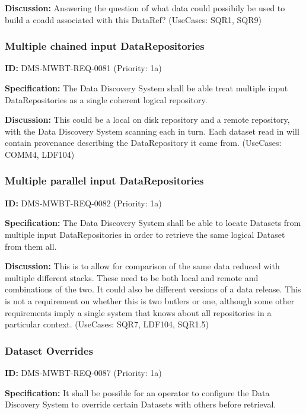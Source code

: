 \documentclass[SE,toc,lsstdraft]{lsstdoc}
\begin{document}
\textbf{Discussion:}
Answering the question of what data could possibily be used to build a coadd associated with this DataRef? (UseCases: SQR1, SQR9)

\subsubsection{Multiple chained input DataRepositories}

\label{DMS-MWBT-REQ-0081}
\textbf{ID:} DMS-MWBT-REQ-0081 (Priority: 1a)

\textbf{Specification:}
The Data Discovery System shall be able treat multiple input DataRepositories as a single coherent logical repository.

\textbf{Discussion:}
This could be a local on disk repository and a remote repository, with the Data Discovery System scanning each in turn. Each dataset read in will contain provenance describing the DataRepository it came from. (UseCases: COMM4, LDF104)

\subsubsection{Multiple parallel input DataRepositories}

\label{DMS-MWBT-REQ-0082}
\textbf{ID:} DMS-MWBT-REQ-0082 (Priority: 1a)

\textbf{Specification:}
The Data Discovery System shall be able to locate Datasets from multiple input DataRepositories in order to retrieve the same logical Dataset from them all.

\textbf{Discussion:}
This is to allow for comparison of the same data reduced with multiple different stacks. These need to be both local and remote and combinations of the two. It could also be different versions of a data release. This is not a requirement on whether this is two butlers or one, although some other requirements imply a single system that knows about all repositories in a particular context. (UseCases: SQR7, LDF104, SQR1.5)

\subsubsection{Dataset Overrides}

\label{DMS-MWBT-REQ-0087}
\textbf{ID:} DMS-MWBT-REQ-0087 (Priority: 1a)

\textbf{Specification:}
It shall be possible for an operator to configure the Data Discovery System to override certain Datasets with others before retrieval.
\end{document}
